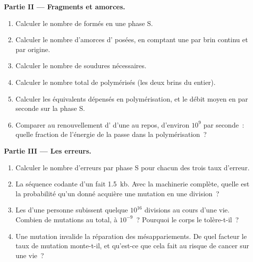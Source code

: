 \begin{problem}
\medskip
\noindent\textbf{Partie II --- Fragments et amorces.}
\begin{enumerate}[resume]
  \item Calculer le nombre de  formés en une phase S.
  \item Calculer le nombre d'amorces d' posées, en comptant une par
        brin continu et par origine.
  \item Calculer le nombre de soudures nécessaires.
  \item Calculer le nombre total de  polymérisés (les deux
        brins du  entier).
  \item Calculer les équivalents  dépensés en polymérisation, et le
        débit moyen en  par seconde sur la phase S.
  \item Comparer au renouvellement d' d'une  au repos,
        d'environ $10^9$ par seconde~: quelle fraction de l'énergie de
        la  passe dans la polymérisation~?
\end{enumerate}

\medskip
\noindent\textbf{Partie III --- Les erreurs.}
\begin{enumerate}[resume]
  \item Calculer le nombre d'erreurs par phase S pour chacun des trois
        taux d'erreur.
  \item La séquence codante d'un  fait \qty{1.5}{kb}. Avec la
        machinerie complète, quelle est la probabilité qu'un  donné
        acquière une mutation en une division~?
  \item Les  d'une personne subissent quelque $10^{16}$
        divisions au cours d'une vie. Combien de mutations au total, à
        $10^{-9}$~? Pourquoi le corps le tolère-t-il~?
  \item Une mutation invalide la réparation des mésappariements. De quel
        facteur le taux de mutation monte-t-il, et qu'est-ce que cela
        fait au risque de cancer sur une vie~?
\end{enumerate}


\end{problem}
